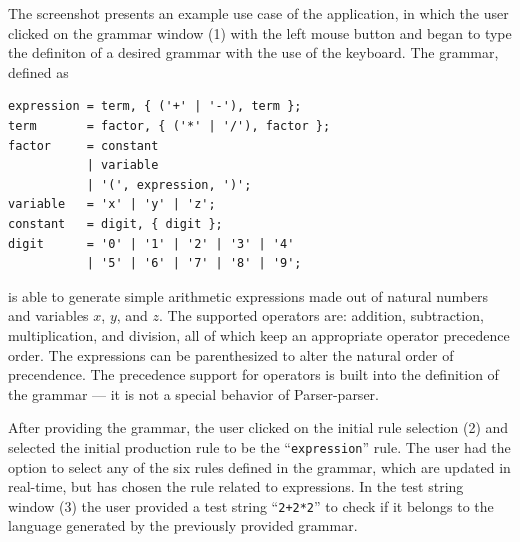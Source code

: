 \documentclass[english,bachelors,forcepolishlogotype]{wizthesis}
\newcommand{\thisproject}{Parser-parser}
\begin{document}
The screenshot presents an example use case of the application, in which the
user clicked on the grammar window (1) with the left mouse button and began to
type the definiton of a desired grammar with the use of the keyboard. The
grammar, defined as
\begin{verbatim}
expression = term, { ('+' | '-'), term };
term       = factor, { ('*' | '/'), factor };
factor     = constant
           | variable
           | '(', expression, ')';
variable   = 'x' | 'y' | 'z';
constant   = digit, { digit };
digit      = '0' | '1' | '2' | '3' | '4'
           | '5' | '6' | '7' | '8' | '9';
\end{verbatim}
is able to generate simple arithmetic expressions made out of natural numbers
and variables $x$, $y$, and $z$. The supported operators are: addition,
subtraction, multiplication, and division, all of which keep an appropriate
operator precedence order. The expressions can be parenthesized to alter the
natural order of precendence. The precedence support for operators is built into
the definition of the grammar --- it is not a special behavior of
\thisproject{}.

After providing the grammar, the user clicked on the initial rule selection (2)
and selected the initial production rule to be the ``\texttt{expression}'' rule.
The user had the option to select any of the six rules defined in the grammar,
which are updated in real-time, but has chosen the rule related to expressions.
In the test string window (3) the user provided a test string ``\texttt{2+2*2}''
to check if it belongs to the language generated by the previously provided
grammar.
\end{document}
